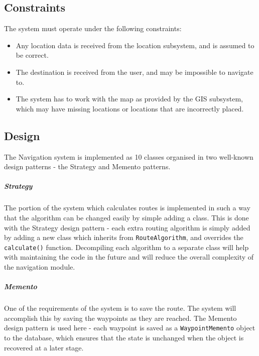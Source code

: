 \documentclass[english]{article}
\begin{document}
        \subsection{Constraints}
            The system must operate under the following constraints:
            \begin{itemize}
                \item Any location data is received from the location subsystem, and is assumed to be correct.
                \item The destination is received from the user, and may be impossible to navigate to.
                \item The system has to work with the map as provided by the GIS subsystem, which may have missing locations or locations that are incorrectly placed.
            \end{itemize}
            
        \subsection{Design}
            The Navigation system is implemented as 10 classes organised in two well-known design patterns - the Strategy and Memento patterns.
            
            \subparagraph{Strategy}
            The portion of the system which calculates routes is implemented in such a way that the algorithm can be changed easily by simple adding a class. This is done with the Strategy design pattern - each extra routing algorithm is simply added by adding a new class which inherits from \texttt{RouteAlgorithm}, and overrides the \texttt{calculate()} function. Decompiling each algorithm to a separate class will help with maintaining the code in the future and will reduce the overall complexity of the navigation module.
            
            \subparagraph{Memento}
            One of the requirements of the system is to save the route. The system will accomplish this by saving the waypoints as they are reached. The Memento design pattern is used here - each waypoint is saved as a \texttt{WaypointMemento} object to the database, which ensures that the state is unchanged when the object is recovered at a later stage.
            
\end{document}
